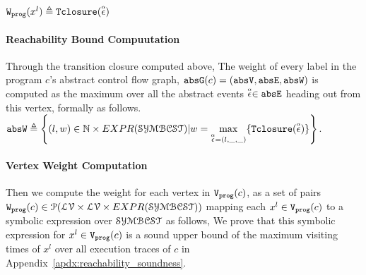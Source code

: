 $
\mathtt{{W_{prog}}}(x^l) 
  \triangleq {\ensuremath{\mathtt{Tclosure}}}(\stackrel{\scriptscriptstyle{\alpha}}{\mathtt{\epsilon}{}})
$
\paragraph*{Reachability Bound Compuutation}
Through the transition closure computed above, 
The weight of every label in 
the program $c$'s abstract control flow graph,
$\mathtt{abs}{\mathtt{G}}(c) =(\mathtt{abs}{\mathtt{V}}, \mathtt{abs}{\mathtt{E}}, \mathtt{abs}{\mathtt{W}})$
is 
computed as the maximum over all the abstract events $\stackrel{\scriptscriptstyle{\alpha}}{\mathtt{\epsilon}{}} \in \mathtt{abs}{\mathtt{E}}$ heading out from this vertex, formally as follows.
\\
$\absW 
\triangleq \left\{ (l, w) \in \mathbb{N} \times EXPR(\constdom) | w = \max\limits_{\absevent = (l, \_, \_)} \{ \absclr(\absevent)\} \right\}$.
\paragraph{Vertex Weight Computation}
Then we compute the weight for each vertex in $\mathtt{{V_{prog}}}(c)$,
as a set of pairs $\mathtt{{W_{prog}}}(c) \in \mathcal{P}(\mathcal{LV} \times \mathcal{LV} \times EXPR(\mathcal{SYMBCST}))$ 
mapping each $x^l \in \mathtt{{V_{prog}}}(c)$ to a symbolic expression over $\mathcal{SYMBCST}$
as follows,
%
We prove that this 
symbolic expression for $x^l \in \mathtt{{V_{prog}}}(c)$ is a sound upper bound of 
the maximum visiting times of $x^l$ over all execution traces of $c$ in Appendix~\ref{apdx:reachability_soundness}. 
%
